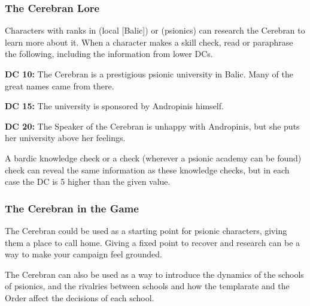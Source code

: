 \subsubsection{The Cerebran Lore}
Characters with ranks in  (local [Balic]) or  (psionics) can research the Cerebran to learn more about it. When a character makes a skill check, read or paraphrase the following, including the information from lower DCs.

\textbf{DC 10:} The Cerebran is a prestigious psionic university in Balic. Many of the great names came from there.

\textbf{DC 15:} The university is sponsored by Andropinis himself.

\textbf{DC 20:} The Speaker of the Cerebran is unhappy with Andropinis, but she puts her university above her feelings.

A bardic knowledge check or a  check (wherever a psionic academy can be found) check can reveal the same information as these knowledge checks, but in each case the DC is 5 higher than the given value.

\subsubsection{The Cerebran in the Game}
The Cerebran could be used as a starting point for psionic characters, giving them a place to call home. Giving a fixed point to recover and research can be a way to make your campaign feel grounded.

The Cerebran can also be used as a way to introduce the dynamics of the schools of psionics, and the rivalries between schools and how the templarate and the Order affect the decisions of each school.